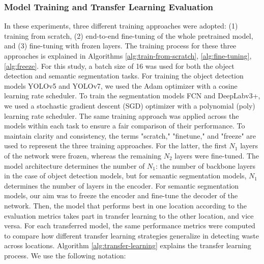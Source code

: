 \documentclass{ieeeaccess}
\begin{document}
\subsubsection{Model Training and Transfer Learning Evaluation}
\label{sec:training_stratergy}
In these experiments, three different training approaches were adopted: (1) training from scratch, (2) end-to-end fine-tuning of the whole pretrained model, and (3) fine-tuning with frozen layers. The training process for these three approaches is explained in Algorithms \ref{alg:train-from-scratch}, \ref{alg:fine-tuning},  \ref{alg:freeze}. For this study, a batch size of 16 was used for both the object detection and semantic segmentation tasks. For training the object detection models YOLOv5 and YOLOv7, we used the Adam optimizer with a cosine learning rate scheduler. To train the segmentation models FCN and DeepLabv3+, we used a stochastic gradient descent (SGD) optimizer with a polynomial (poly) learning rate scheduler. The same training approach was applied across the models within each task to ensure a fair comparison of their performance. To maintain clarity and consistency, the terms "scratch," "finetune," and "freeze" are used to represent the three training approaches. For the latter, the first $N_1$ layers of the network were frozen, whereas the remaining $N_2$ layers were fine-tuned. The model architecture determines the number of $N_1$: the number of backbone layers in the case of object detection models, but for semantic segmentation models, $N_1$ determines the number of layers in the encoder. For semantic segmentation models, our aim was to freeze the encoder and fine-tune the decoder of the network. Then, the model that performs best in one location according to the evaluation metrics takes part in transfer learning to the other location, and vice versa. For each transferred model, the same performance metrics were computed to compare how different transfer learning strategies generalize in detecting waste across locations. Algorithm \ref{alg:transfer-learning} explains the transfer learning process. We use the following notation: 
\end{document}
